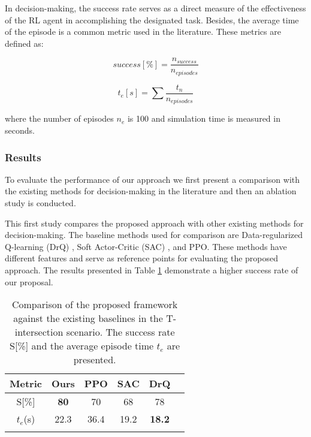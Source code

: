 In decision-making, the success rate serves as a direct measure of the effectiveness of the RL agent in accomplishing the designated task. Besides, the average time of the episode is a common metric used in the literature. These metrics are defined as:

\begin{equation}
	success [\%] = \frac{n_{success}}{n_{episodes}}
\end{equation}

\begin{equation}
	t_{e} [s] = \sum{\frac{t_n}{n_{episodes}}}
\end{equation}

where the number of episodes $n_{e}$ is 100 and simulation time is measured in seconds. 

\subsubsection{Results}
\label{subsubsec:8_decision_making_experimental_results_results}

To evaluate the performance of our approach we first present a comparison with the existing methods for decision-making in the literature and then an ablation study is conducted. 

This first study compares the proposed approach with other existing methods for decision-making. The baseline methods used for comparison are Data-regularized Q-learning (DrQ) \cite{kostrikov2021image}, Soft Actor-Critic (SAC) \cite{haarnoja2019soft}, and PPO. These methods have different features and serve as reference points for evaluating the proposed approach. The results presented in Table \ref{table:comp} demonstrate a higher success rate of our proposal.

\begin{table}[h!]
	\centering
	\captionsetup{justification=justified}
	\caption[Comparison of the proposed framework against the existing baselines in the T-intersection scenario]{Comparison of the proposed framework against the existing baselines in the T-intersection scenario. The success rate S[\%] and the average episode time $t_{e}$ are presented.}
	\label{table:comp}
	\begin{tabular}{c|ccccc} 
		\toprule
		Metric & Ours & PPO & SAC & DrQ \\
		\midrule
		S[\%] & \textbf{80} & 70 & 68 & 78 \\ 
		$t_{e}$(s) & 22.3 & 36.4 & 19.2 & \textbf{18.2} \\
		\bottomrule
		\ChangeRT{1pt}
	\end{tabular}
\end{table}

